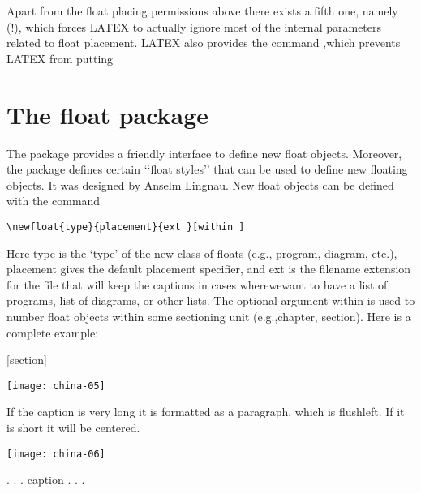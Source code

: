 Apart from the float placing permissions above there exists a fifth one, namely (!), which
forces LATEX to actually ignore most of the internal parameters related to float placement.
LATEX also provides the command ,which prevents LATEX from putting


\section{The float package}

The  package provides a friendly interface to define new float objects. Moreover, the package
defines certain ‘‘float styles’’ that can be used to define new floating objects.  It
was designed by Anselm Lingnau. New float objects can be defined with the command

\begin{verbatim}
\newfloat{type}{placement}{ext }[within ]
\end{verbatim}



Here type is the `type'  of the new class of floats (e.g., program, diagram, etc.),
placement gives the default placement specifier, and ext is the filename extension
for the file that will keep the captions in cases wherewewant to have a list of programs,
list of diagrams, or other lists. The optional argument within is used to number float
objects within some sectioning unit (e.g.,chapter, section). Here is a complete example:

\begin{teXXX}
[section]
\end{teXXX}



\makeatletter



\begin{Photo}
 \centering
 \texttt{[image: china-05]}
\caption[a short caption]{If the caption is very long it is formatted as a paragraph, which is flushleft. If it is short it will be centered. }
\end{Photo}


\begin{Photo}
 \centering
 \texttt{[image: china-06]}
\caption{. . . caption . . . }
\end{Photo}

